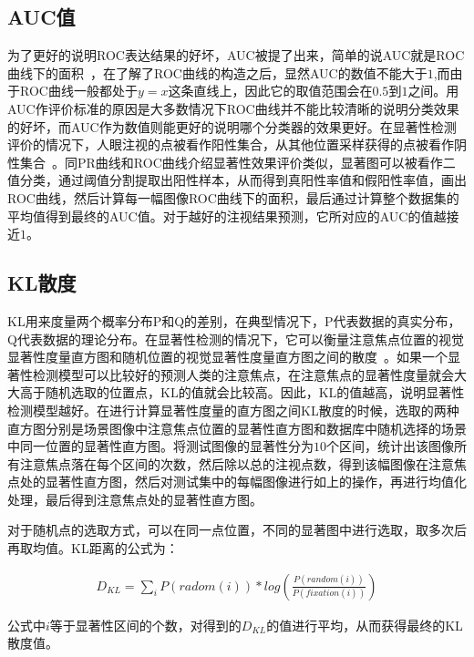 \subsection{AUC值}
\label{2_5_2}

为了更好的说明ROC表达结果的好坏，AUC被提了出来，简单的说AUC就是ROC曲线下的面积~\cite{Green1966book}，在了解了ROC曲线的构造之后，显然AUC的数值不能大于$1$,而由于ROC曲线一般都处于$y=x$这条直线上，因此它的取值范围会在$0.5$到$1$之间。用AUC作评价标准的原因是大多数情况下ROC曲线并不能比较清晰的说明分类效果的好坏，而AUC作为数值则能更好的说明哪个分类器的效果更好。在显著性检测评价的情况下，人眼注视的点被看作阳性集合，从其他位置采样获得的点被看作阴性集合~\cite{Tatler2005correlates}。同PR曲线和ROC曲线介绍显著性效果评价类似，显著图可以被看作二值分类，通过阈值分割提取出阳性样本，从而得到真阳性率值和假阳性率值，画出ROC曲线，然后计算每一幅图像ROC曲线下的面积，最后通过计算整个数据集的平均值得到最终的AUC值。对于越好的注视结果预测，它所对应的AUC的值越接近$1$。

\subsection{KL散度}
\label{2_5_3}

KL用来度量两个概率分布P和Q的差别，在典型情况下，P代表数据的真实分布，Q代表数据的理论分布。在显著性检测的情况下，它可以衡量注意焦点位置的视觉显著性度量直方图和随机位置的视觉显著性度量直方图之间的散度~\cite{Kullback1959book,IttiCVPR2005principled}。如果一个显著性检测模型可以比较好的预测人类的注意焦点，在注意焦点的显著性度量就会大大高于随机选取的位置点，KL的值就会比较高。因此，KL的值越高，说明显著性检测模型越好。在进行计算显著性度量的直方图之间KL散度的时候，选取的两种直方图分别是场景图像中注意焦点位置的显著性直方图和数据库中随机选择的场景中同一位置的显著性直方图。将测试图像的显著性分为$10$个区间，统计出该图像所有注意焦点落在每个区间的次数，然后除以总的注视点数，得到该幅图像在注意焦点处的显著性直方图，然后对测试集中的每幅图像进行如上的操作，再进行均值化处理，最后得到注意焦点处的显著性直方图。

对于随机点的选取方式，可以在同一点位置，不同的显著图中进行选取，取多次后再取均值。KL距离的公式为：
\begin{linenomath}
\begin{align}
D_{KL}=\sum_{i}P(radom(i))*log(\frac{P(random(i))}{P(fixation(i))})
\label{式2_42}
\end{align}
\end{linenomath}
公式中$i$等于显著性区间的个数，对得到的$D_{KL}$的值进行平均，从而获得最终的KL散度值。

